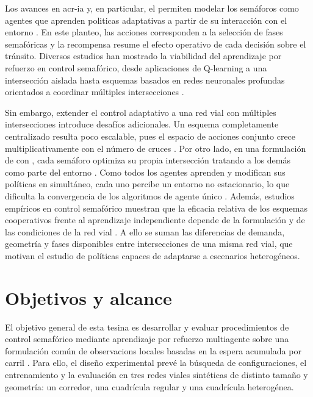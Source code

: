 Los avances en \gls{acr-ia} y, en particular, el  permiten modelar los semáforos como \glspl{agente} que aprenden \glspl{politica} adaptativas a partir de su interacción con el \gls{entorno} \cite{MDPI_Infrastructures2025_RLReview}. En este planteo, las acciones corresponden a la selección de fases semafóricas y la \gls{recompensa} resume el efecto operativo de cada decisión sobre el tránsito. Diversos estudios han mostrado la viabilidad del aprendizaje por refuerzo en control semafórico, desde aplicaciones de Q-learning a una intersección aislada \cite{Abdulhai2003} hasta esquemas basados en redes neuronales profundas orientados a coordinar múltiples intersecciones \cite{WeiH2019ASTSCM}.

Sin embargo, extender el control adaptativo a una red vial con múltiples intersecciones introduce desafíos adicionales. Un esquema completamente centralizado resulta poco escalable, pues el espacio de acciones conjunto crece multiplicativamente con el número de cruces \cite{marlbook}. Por otro lado, en una formulación de  con , cada semáforo optimiza su propia intersección tratando a los demás como parte del entorno \cite{marlbook}. Como todos los agentes aprenden y modifican sus políticas en simultáneo, cada uno percibe un entorno no estacionario, lo que dificulta la convergencia de los algoritmos de agente único \cite{foerster2017}. Además, estudios empíricos en control semafórico muestran que la eficacia relativa de los esquemas cooperativos frente al aprendizaje independiente depende de la formulación y de las condiciones de la red vial \cite{Ault2022_MARL_Limitations}. A ello se suman las diferencias de demanda, geometría y fases disponibles entre intersecciones de una misma red vial, que motivan el estudio de políticas capaces de adaptarse a escenarios heterogéneos.

\section{Objetivos y alcance}\label{sec:objetivos_alcance}

El objetivo general de esta tesina es desarrollar y evaluar procedimientos de control semafórico mediante aprendizaje por refuerzo multiagente sobre una formulación común de \glspl{observacion} locales basadas en la espera acumulada por carril \cite{genders2018representations}. Para ello, el diseño experimental prevé la búsqueda de configuraciones, el entrenamiento y la evaluación en tres redes viales sintéticas de distinto tamaño y geometría: un corredor, una cuadrícula regular y una cuadrícula heterogénea.

